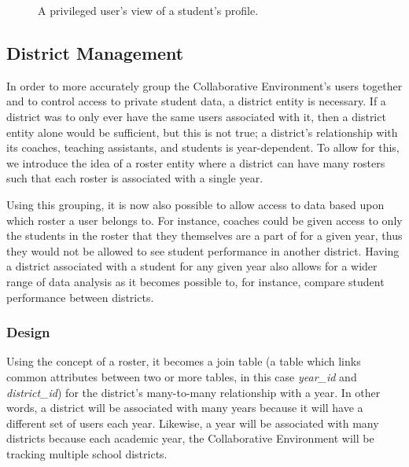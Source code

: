 \begin{figure}[h!]
	\centering
	\caption{A privileged user's view of a student's profile.}
	\label{fig:screens-user-student-profile}
\end{figure}


\subsection{District Management}
\label{subsec:design-district}
In order to more accurately group the Collaborative Environment's users together and to control access to private student data, a district entity is necessary. If a district was to only ever have the same users associated with it, then a district entity alone would be sufficient, but this is not true; a district's relationship with its coaches, teaching assistants, and students is year-dependent. To allow for this, we introduce the idea of a roster entity where a district can have many rosters such that each roster is associated with a single year.

Using this grouping, it is now also possible to allow access to data based upon which roster a user belongs to. For instance, coaches could be given access to only the students in the roster that they themselves are a part of for a given year, thus they would not be allowed to see student performance in another district. Having a district associated with a student for any given year also allows for a wider range of data analysis as it becomes possible to, for instance, compare student performance between districts.

\subsubsection{Design}
Using the concept of a roster, it becomes a join table (a table which links common attributes between two or more tables, in this case \emph{year\_id} and \emph{district\_id}) for the district's many-to-many relationship with a year. In other words, a district will be associated with many years because it will have a different set of users each year. Likewise, a year will be associated with many districts because each academic year, the Collaborative Environment will be tracking multiple school districts.

